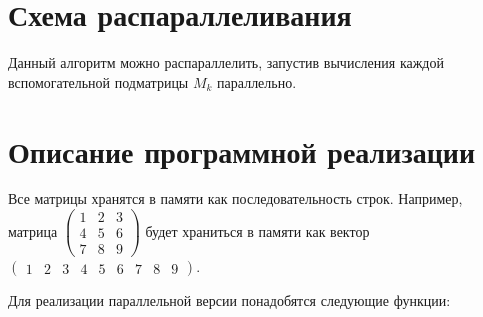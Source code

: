 \documentclass{report}
\begin{document}
\section{Схема распараллеливания}
\par Данный алгоритм можно распараллелить, запустив вычисления каждой вспомогательной подматрицы $M_k$ параллельно.



\newpage
\section{Описание программной реализации}
\par Все матрицы хранятся в памяти как последовательность строк. Например, матрица $\begin{pmatrix}1 & 2 & 3 \\ 4 & 5 & 6 \\ 7 & 8 & 9\end{pmatrix}$ будет храниться в памяти как вектор \\ $\begin{pmatrix}1 & 2 & 3 & 4 & 5 & 6 & 7 & 8 & 9\end{pmatrix}$.
\par Для реализации параллельной версии понадобятся следующие функции:
\end{document}
